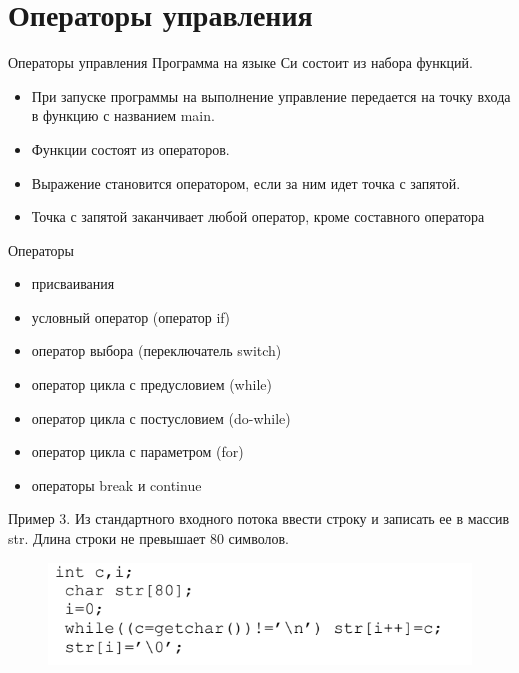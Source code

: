 \documentclass{beamer}
\begin{document}
\section{Операторы управления}
\begin{frame}{Операторы управления}
Программа на языке Си состоит из набора функций.
\begin{itemize}
\item При запуске программы на выполнение управление передается на точку входа в функцию с названием main.
\item Функции состоят из операторов. 
\item Выражение становится оператором, если за ним идет точка с запятой. 
\item Точка с запятой заканчивает любой оператор, кроме составного оператора { }
\end{itemize}
\begin{block}{Операторы}
\begin{itemize}
\item присваивания
\item условный оператор (оператор if)
\item оператор выбора (переключатель switch)
\item оператор цикла с предусловием (while)
\item оператор цикла с постусловием (do-while)
\item оператор цикла с параметром (for)
\item операторы break и continue
\end{itemize}
\end{block}
\end{frame} 

\begin{frame}
Пример 3. Из стандартного входного потока ввести строку и записать ее в массив str. Длина строки не превышает 80 символов. 
\begin{figure}[h]
\centering
\includegraphics[scale=0.5]{images/lec02-pic07.png}
\end{figure}
\end{frame}
\end{document}
